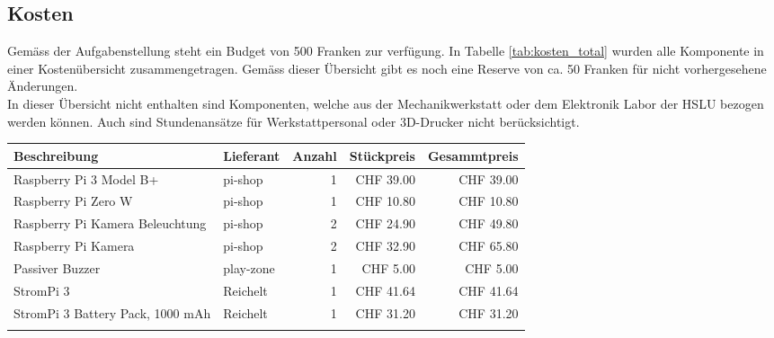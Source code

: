 \documentclass[../../main.tex]{subfiles}
\begin{document}
\subsection{Kosten}
Gemäss der Aufgabenstellung steht ein Budget von 500 Franken zur verfügung. In Tabelle \ref{tab:kosten_total} wurden alle Komponente in einer Kostenübersicht zusammengetragen. Gemäss dieser Übersicht gibt es noch eine Reserve von ca. 50 Franken für nicht vorhergesehene Änderungen.\\
In dieser Übersicht nicht enthalten sind Komponenten, welche aus der Mechanikwerkstatt oder dem Elektronik Labor der
HSLU bezogen werden können. Auch sind Stundenansätze für Werkstattpersonal oder 3D-Drucker nicht berücksichtigt. \\

\begin{table}[H] \centering
    \begin{tabular}{|p{6cm}|l|r|r|r|}
    \hline
    \textbf{Beschreibung}                                   & \textbf{Lieferant} & \textbf{Anzahl} & \textbf{Stückpreis} & \textbf{Gesammtpreis} \\ \hline
    Raspberry Pi 3 Model B+                                 & pi-shop            & 1               & CHF 39.00           & CHF 39.00             \\ \hline \nocite{PiShopPi3ModelBp}
    Raspberry Pi Zero W                                     & pi-shop            & 1               & CHF 10.80           & CHF 10.80             \\ \hline \nocite{PiShopPiZero}
    Raspberry Pi Kamera Beleuchtung                         & pi-shop            & 2               & CHF 24.90           & CHF 49.80             \\ \hline \nocite{PiShopBrightPi}
    Raspberry Pi Kamera                                     & pi-shop            & 2               & CHF 32.90           & CHF 65.80             \\ \hline \nocite{PiShopPiKamera}
    Passiver Buzzer                                         & play-zone          & 1               & CHF 5.00            & CHF 5.00              \\ \hline \nocite{PlayZonePassiverBuzzer}
    StromPi 3                                               & Reichelt           & 1               & CHF 41.64           & CHF 41.64             \\ \hline \nocite{ReicheltStromPi}
    StromPi 3 Battery Pack, 1000 mAh                        & Reichelt           & 1               & CHF 31.20           & CHF 31.20             \\ \hline \nocite{ReicheltStromPiAkku}

\end{tabular}
\end{table}
\end{document}
